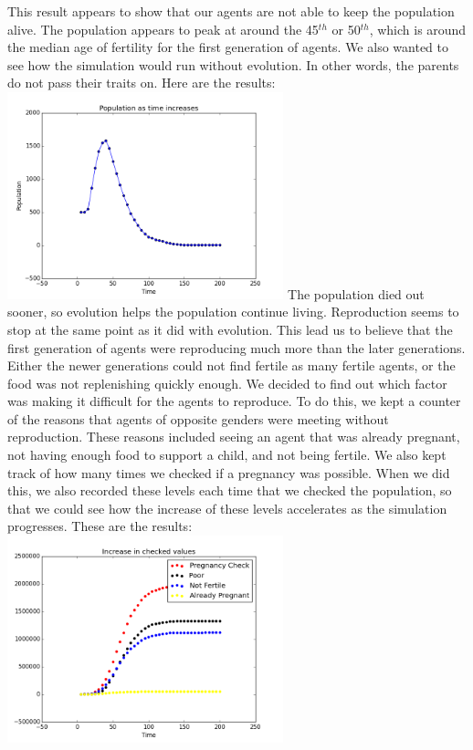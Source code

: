 \documentclass[11pt]{article}
\begin{document}
\begin{multicols}{2}
This result appears to show that our agents are not able to keep the population alive. The population appears to peak at around the 45$^{th}$ or 50$^{th}$, which is around the median age of fertility for the first generation of agents. We also wanted to see how the simulation would run without evolution. In other words, the parents do not pass their traits on. Here are the results: \newline
\includegraphics[width=80mm]{Population500noevo.png} \newline
The population died out sooner, so evolution helps the population continue living. \newline
Reproduction seems to stop at the same point as it did with evolution.
This lead us to believe that the first generation of agents were reproducing much more than the later generations. Either the newer generations could not find fertile as many fertile agents, or the food was not replenishing quickly enough. We decided to find out which factor was making it difficult for the agents to reproduce.
\newline
To do this, we kept a counter of the reasons that agents of opposite genders were meeting without reproduction. These reasons included seeing an agent that was already pregnant, not having enough food to support a child, and not being fertile. We also kept track of how many times we checked if a pregnancy was possible. When we did this, we also recorded these levels each time that we checked the population, so that we could see how the increase of these levels accelerates as the simulation progresses. These are the results: \newline
\includegraphics[width=80mm]{factors500.png} \newline

\end{multicols}
\end{document}

